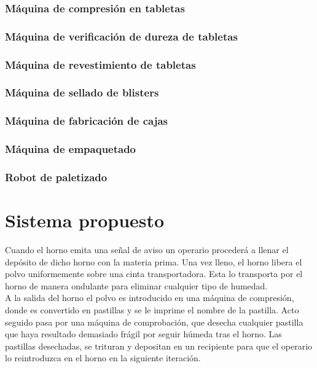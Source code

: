 	\subsubsection{Máquina de compresión en tabletas}
	\subsubsection{Máquina de verificación de dureza de tabletas}
	\subsubsection{Máquina de revestimiento de tabletas}
	\subsubsection{Máquina de sellado de blisters }
	\subsubsection{Máquina de fabricación de cajas}	
	\subsubsection{Máquina de empaquetado}
	\subsubsection{Robot de paletizado}
\section{Sistema propuesto}


Cuando el horno emita una señal de aviso un operario procederá a llenar el depósito de dicho horno con la materia prima. Una vez lleno, el horno libera el polvo uniformemente sobre una cinta transportadora. Esta lo transporta por el horno de manera ondulante para eliminar cualquier tipo de humedad. 
\\

A la salida del horno el polvo es introducido en una máquina de compresión, donde es convertido en pastillas y se le imprime el nombre de la pastilla.  Acto seguido pasa por una máquina de comprobación, que desecha cualquier pastilla que haya resultado demasiado frágil por seguir húmeda tras el horno. Las pastillas desechadas, se trituran y depositan en un recipiente para que el operario lo reintroduzca en el horno en la siguiente iteración. 
\\

